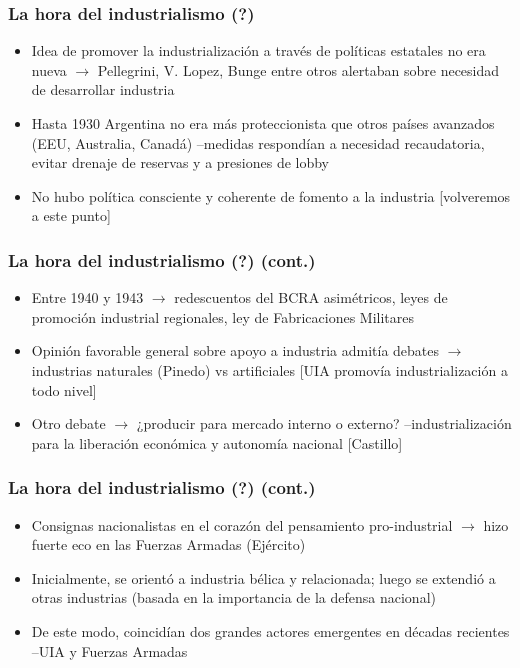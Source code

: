 \documentclass[14pt,aspectratio=169]{beamer}
\begin{document}
\begin{frame}\frametitle{La hora del industrialismo (?)}
   \begin{itemize} \itemsep 10pt
   \item Idea de promover la industrialización a través de políticas
     estatales no era nueva $\longrightarrow$ Pellegrini, V. Lopez,
     Bunge entre otros alertaban sobre necesidad de desarrollar
     industria
     \item Hasta 1930 Argentina no era más proteccionista que otros
       países avanzados (EEU, Australia, Canadá) --medidas respondían
       a necesidad recaudatoria, evitar drenaje de reservas y a
       presiones de lobby
       \item No hubo política consciente y coherente de fomento a la
         industria [volveremos a este punto] 
   \end{itemize}
 \end{frame}
                 


\begin{frame}\frametitle{La hora del industrialismo (?) (cont.)}
   \begin{itemize} \itemsep 10pt
   \item Entre 1940 y 1943 $\longrightarrow$ redescuentos del BCRA
     asimétricos, leyes de promoción industrial regionales, ley de
     Fabricaciones Militares
     \item Opinión favorable general sobre apoyo a industria admitía
       debates $\longrightarrow$ industrias naturales (Pinedo) vs
       artificiales [UIA promovía industrialización a todo nivel]
          \item Otro debate $\longrightarrow$ ¿producir para mercado
            interno o externo? --industrialización para la liberación
            económica y autonomía nacional [Castillo]            
   \end{itemize}
 \end{frame}
             
 
\begin{frame}\frametitle{La hora del industrialismo (?) (cont.)}
   \begin{itemize} \itemsep 10pt
   \item Consignas nacionalistas en el corazón del pensamiento
     pro-industrial $\longrightarrow$ hizo fuerte eco en las Fuerzas
     Armadas (Ejército)
     \item Inicialmente, se orientó a industria bélica y relacionada;
       luego se extendió a otras industrias (basada en la importancia
       de la defensa nacional)
       \item De este modo, coincidían dos grandes actores emergentes
         en décadas recientes --UIA y Fuerzas Armadas
   \end{itemize}
 \end{frame}
\end{document}
